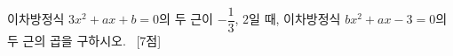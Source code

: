 이차방정식 $3x^2+ax+b=0$의 두 근이 $-\dfrac{1}{3}$, $2$일 때, 이차방정식 $bx^2+ax-3=0$의 두 근의 곱을 구하시오. ~\mbox{\mbox{[7점]}}
